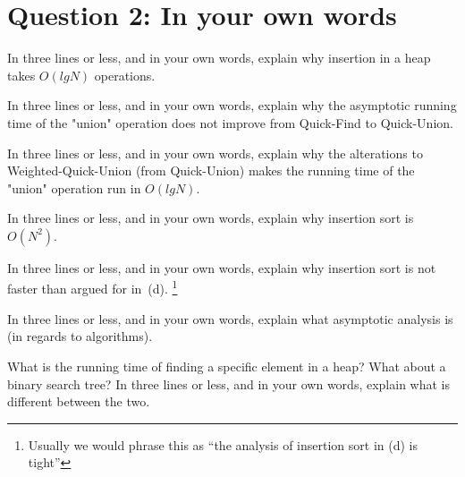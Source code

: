 \documentclass{tufte-handout}
\begin{document}
\section{\textbf{Question 2}: In your own words}
\begin{description}

  \medskip\item[(a)]
  In three lines or less, and in your own words, explain why insertion in a heap takes $O(lg N)$ operations.
  \medskip\item[(b)]
  In three lines or less, and in your own words, explain why the asymptotic running time of the "union" operation does not improve from Quick-Find to Quick-Union.
    \medskip\item[(c)]
    In three lines or less, and in your own words, explain why the alterations to Weighted-Quick-Union (from Quick-Union) makes the running time of the "union" operation run in $O(lg N)$.
    \medskip\item[(d)]
    In three lines or less, and in your own words, explain why insertion sort is $O(N^2)$.
    \medskip\item[(e)]
    In three lines or less, and in your own words, explain why insertion sort is not faster than argued for in~(d).
    \footnote{Usually we would phrase this as ``the analysis of insertion sort in (d) is tight''}
    \medskip\item[(f)]
    In three lines or less, and in your own words, explain what asymptotic analysis is (in regards to algorithms).
    \medskip\item[(g)]
    What is the running time of finding a specific element in a heap? What about a binary search tree? In three lines or less, and in your own words, explain what is different between the two.
\end{description}
\end{document}

